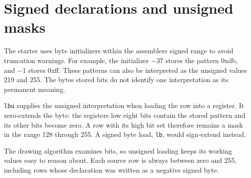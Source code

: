 \section{Signed declarations and unsigned
  masks}\label{003-eight-byte-sprite-p01-signed-declarations-and-unsigned-masks}

The starter uses byte initializers within the
assembler\textquotesingle s signed range to avoid truncation warnings.
For example, the initializer \ensuremath{-}37 stores the pattern 0xdb, and \ensuremath{-}1 stores
0xff. These patterns can also be interpreted as the unsigned values 219
and 255. The byte\textquotesingle s stored bits do not identify one
interpretation as its permanent meaning.

\texttt{lbu} supplies the unsigned interpretation when loading the row
into a register. It zero-extends the byte: the
register\textquotesingle s low eight bits contain the stored pattern and
its other bits become zero. A row with its high bit set therefore
remains a mask in the range 128 through 255. A signed byte load,
\texttt{lb}, would sign-extend instead.

The drawing algorithm examines bits, so unsigned loading keeps its
working values easy to reason about. Each source row is always between
zero and 255, including rows whose declaration was written as a negative
signed byte.
